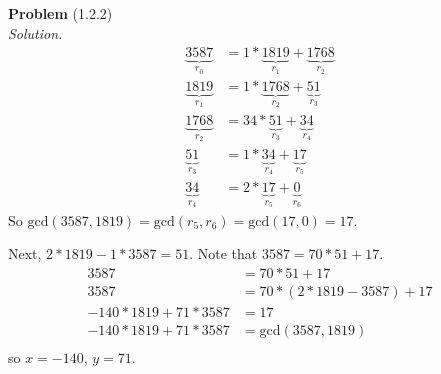 \documentclass[12 pt]{amsart}
\begin{document}
\phantom{\quad} \vfill
\noindent
\textbf{Problem} (1.2.2) \\[4ex]
\emph{Solution.} \\[2ex]
  \begin{align*}
    \underbrace{3587}_{r_0} &= 1 * \underbrace{1819}_{r_1} + \underbrace{1768}_{r_2} \\
    \underbrace{1819}_{r_1} &= 1 * \underbrace{1768}_{r_2} + \underbrace{51}_{r_3} \\
    \underbrace{1768}_{r_2} &= 34 * \underbrace{51}_{r_3}  + \underbrace{34}_{r_4} \\
    \underbrace{51}_{r_3}   &= 1 * \underbrace{34}_{r_4} + \underbrace{17}_{r_5} \\
    \underbrace{34}_{r_4}   &= 2 * \underbrace{17}_{r_5} + \underbrace{0}_{r_6}
  \end{align*}
  So $\text{gcd}(3587, 1819) = \text{gcd}(r_5, r_6) = \text{gcd}(17, 0) = 17$.

  Next, $2 * 1819 - 1 * 3587 = 51$.
  Note that $3587 = 70 * 51 + 17$.
  \begin{align*}
    3587 &= 70 * 51 + 17 \\
    3587 &= 70 * (2 * 1819 - 3587) + 17 \\
    -140 * 1819 + 71 * 3587 &= 17 \\
    -140 * 1819 + 71 * 3587 &= \text{gcd}(3587, 1819) \\
  \end{align*}
  so $x = -140$, $y = 71$.
\vfill
\newpage
\end{document}
